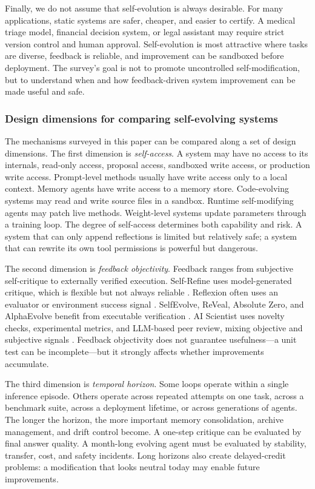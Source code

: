 Finally, we do not assume that self-evolution is always desirable. For many applications, static systems are safer, cheaper, and easier to certify. A medical triage model, financial decision system, or legal assistant may require strict version control and human approval. Self-evolution is most attractive where tasks are diverse, feedback is reliable, and improvement can be sandboxed before deployment. The survey's goal is not to promote uncontrolled self-modification, but to understand when and how feedback-driven system improvement can be made useful and safe.


\subsubsection{Design dimensions for comparing self-evolving systems}

The mechanisms surveyed in this paper can be compared along a set of design dimensions. The first dimension is \emph{self-access}. A system may have no access to its internals, read-only access, proposal access, sandboxed write access, or production write access. Prompt-level methods usually have write access only to a local context. Memory agents have write access to a memory store. Code-evolving systems may read and write source files in a sandbox. Runtime self-modifying agents may patch live methods. Weight-level systems update parameters through a training loop. The degree of self-access determines both capability and risk. A system that can only append reflections is limited but relatively safe; a system that can rewrite its own tool permissions is powerful but dangerous.

The second dimension is \emph{feedback objectivity}. Feedback ranges from subjective self-critique to externally verified execution. Self-Refine uses model-generated critique, which is flexible but not always reliable \cite{selfrefine2023}. Reflexion often uses an evaluator or environment success signal \cite{reflexion2023}. SelfEvolve, ReVeal, Absolute Zero, and AlphaEvolve benefit from executable verification \cite{selfevolve2023,reveal2025,absolutezero2025,alphaevolve2025}. AI Scientist uses novelty checks, experimental metrics, and LLM-based peer review, mixing objective and subjective signals \cite{aiscientist2024}. Feedback objectivity does not guarantee usefulness---a unit test can be incomplete---but it strongly affects whether improvements accumulate.

The third dimension is \emph{temporal horizon}. Some loops operate within a single inference episode. Others operate across repeated attempts on one task, across a benchmark suite, across a deployment lifetime, or across generations of agents. The longer the horizon, the more important memory consolidation, archive management, and drift control become. A one-step critique can be evaluated by final answer quality. A month-long evolving agent must be evaluated by stability, transfer, cost, and safety incidents. Long horizons also create delayed-credit problems: a modification that looks neutral today may enable future improvements.

